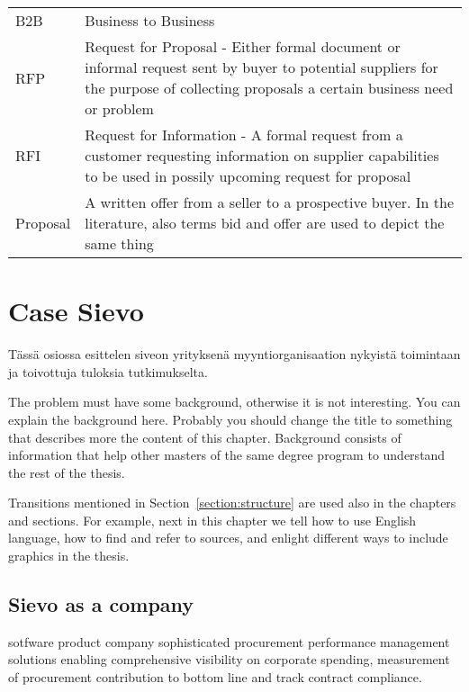 \documentclass[12pt,a4paper,oneside,pdftex]{report}
\begin{document}
\noindent
\begin{longtable}{@{}p{}p{}@{}}
B2B & Business to Business \\
RFP & Request for Proposal - Either formal document or informal request sent by buyer to potential suppliers for the purpose of collecting proposals a certain business need or problem \\
RFI & Request for Information - A formal request from a customer requesting information on supplier capabilities to be used in possily upcoming request for proposal \\
Proposal  & A written offer from a seller to a prospective buyer. In the literature, also terms bid and offer are used to depict the same thing \\

\end{longtable}

% 

\chapter{Case Sievo}
\label{chapter:Case Sievo}

Tässä osiossa esittelen siveon yrityksenä myyntiorganisaation nykyistä toimintaan ja toivottuja tuloksia tutkimukselta.

The problem must have some background, otherwise it is not
interesting.  You can explain the background here. Probably you should
change the title to something that describes more the content of this
chapter. Background consists of information that help other masters of
the same degree program to understand the rest of the thesis.

Transitions mentioned in Section~\ref{section:structure} are used also
in the chapters and sections. For example, next in this chapter we
tell how to use English language, how to find and refer to sources,
and enlight different ways to include graphics in the thesis.

\section{Sievo as a company}



sotfware product company
sophisticated procurement performance management solutions enabling comprehensive visibility on corporate spending, measurement of procurement contribution to bottom line and track contract compliance. 
\end{document}
